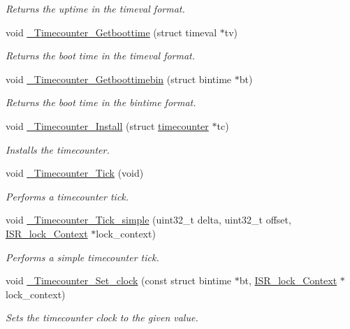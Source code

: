 \begin{DoxyCompactItemize}
\begin{DoxyCompactList}\small\item\em Returns the uptime in the timeval format. \end{DoxyCompactList}\item 
void \mbox{\hyperlink{group__RTEMSScoreTimecounter_ga46836e8f099926fe84e24d8e5407703b}{\+\_\+\+Timecounter\+\_\+\+Getboottime}} (struct timeval $\ast$tv)
\begin{DoxyCompactList}\small\item\em Returns the boot time in the timeval format. \end{DoxyCompactList}\item 
void \mbox{\hyperlink{group__RTEMSScoreTimecounter_ga41f147a1c7305dbf07ed216067c44428}{\+\_\+\+Timecounter\+\_\+\+Getboottimebin}} (struct bintime $\ast$bt)
\begin{DoxyCompactList}\small\item\em Returns the boot time in the bintime format. \end{DoxyCompactList}\item 
void \mbox{\hyperlink{group__RTEMSScoreTimecounter_ga9e8609916ba1b0f683b25b3b7874c531}{\+\_\+\+Timecounter\+\_\+\+Install}} (struct \mbox{\hyperlink{structtimecounter}{timecounter}} $\ast$tc)
\begin{DoxyCompactList}\small\item\em Installs the timecounter. \end{DoxyCompactList}\item 
\mbox{\label{group__RTEMSScoreTimecounter_ga1b761aa4add622802fcaad075607745c}} 
void \mbox{\hyperlink{group__RTEMSScoreTimecounter_ga1b761aa4add622802fcaad075607745c}{\+\_\+\+Timecounter\+\_\+\+Tick}} (void)
\begin{DoxyCompactList}\small\item\em Performs a timecounter tick. \end{DoxyCompactList}\item 
void \mbox{\hyperlink{group__RTEMSScoreTimecounter_ga4846ddfe4d962ac1cc41c022f7ae0d60}{\+\_\+\+Timecounter\+\_\+\+Tick\+\_\+simple}} (uint32\+\_\+t delta, uint32\+\_\+t offset, \mbox{\hyperlink{structISR__lock__Context}{I\+S\+R\+\_\+lock\+\_\+\+Context}} $\ast$lock\+\_\+context)
\begin{DoxyCompactList}\small\item\em Performs a simple timecounter tick. \end{DoxyCompactList}\item 
void \mbox{\hyperlink{group__RTEMSScoreTimecounter_gaf945e2324ee8b00d80b8e22a199c5a3c}{\+\_\+\+Timecounter\+\_\+\+Set\+\_\+clock}} (const struct bintime $\ast$bt, \mbox{\hyperlink{structISR__lock__Context}{I\+S\+R\+\_\+lock\+\_\+\+Context}} $\ast$lock\+\_\+context)
\begin{DoxyCompactList}\small\item\em Sets the timecounter clock to the given value. \end{DoxyCompactList}\end{DoxyCompactItemize}
